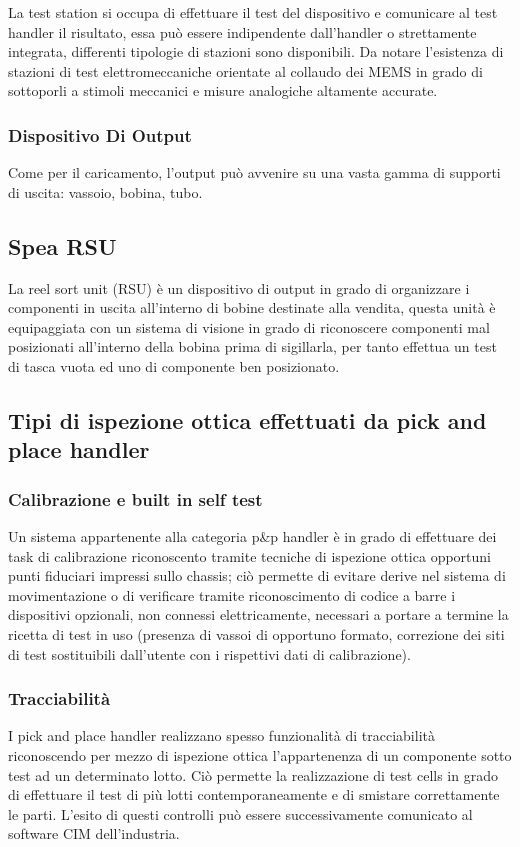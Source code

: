 La test station si occupa di effettuare il test del dispositivo e comunicare al test handler il risultato, essa può essere indipendente dall'handler o strettamente integrata, differenti tipologie di stazioni sono 
disponibili. Da notare l'esistenza di stazioni di test elettromeccaniche orientate al collaudo dei MEMS in 
grado di sottoporli a stimoli meccanici e misure analogiche altamente accurate.  

\subsubsection{Dispositivo Di Output} 

Come per il caricamento, l'output può avvenire su una vasta gamma di supporti di uscita: vassoio, bobina, tubo. 

\subsection{Spea RSU} 

La reel sort unit (RSU) è un dispositivo di output in grado di organizzare i componenti in uscita all'interno di 
bobine destinate alla vendita, questa unità è equipaggiata con un sistema di visione in grado di 
riconoscere componenti mal posizionati all'interno della bobina prima di sigillarla, per  tanto effettua un 
test di tasca vuota ed uno di componente ben posizionato. 


\subsection{Tipi di ispezione ottica effettuati da pick and place handler}
\subsubsection{Calibrazione e built in self test}
Un sistema appartenente alla categoria p\&p handler è in grado di effettuare dei task di calibrazione
riconoscento tramite tecniche di ispezione ottica opportuni punti fiduciari impressi sullo chassis; ciò permette di evitare derive nel sistema di movimentazione o di verificare tramite riconoscimento di codice a
barre i dispositivi opzionali, non connessi elettricamente, necessari a portare a termine la ricetta di test in uso (presenza di vassoi di opportuno formato, correzione dei siti di test sostituibili dall'utente con i rispettivi dati di calibrazione).
\subsubsection{Tracciabilità}
I pick and place handler realizzano spesso funzionalità di tracciabilità riconoscendo per mezzo di
ispezione ottica l'appartenenza di un componente sotto test ad un determinato lotto. Ciò permette la realizzazione di test cells in grado di effettuare il test di più lotti contemporaneamente e di smistare
correttamente le parti. L'esito di questi controlli può essere successivamente comunicato al software CIM dell'industria.

